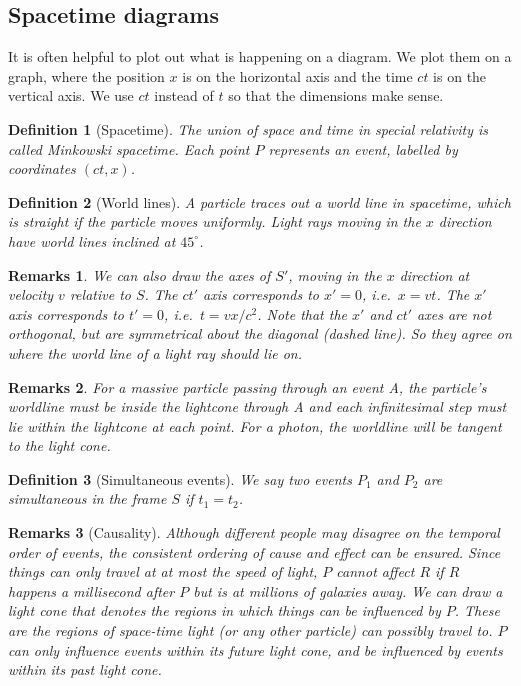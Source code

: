 \documentclass[a4paper]{article}
\newtheorem{remarks}{Remarks}[section]
\theoremstyle{new}
\newtheorem{defi}{Definition}[section]
\begin{document}
\subsection{Spacetime diagrams}
It is often helpful to plot out what is happening on a diagram. We plot them on a graph, where the position $x$ is on the horizontal axis and the time $ct$ is on the vertical axis. We use $ct$ instead of $t$ so that the dimensions make sense.
\begin{defi}[Spacetime]
  The union of space and time in special relativity is called Minkowski spacetime. Each point $P$ represents an event, labelled by coordinates $(ct, x)$. 
\end{defi}
\begin{defi}[World lines]
  A particle traces out a world line in spacetime, which is straight if the particle moves uniformly. Light rays moving in the $x$ direction have world lines inclined at $45^\circ$.
\end{defi}
\begin{remarks}
We can also draw the axes of $S'$, moving in the $x$ direction at velocity $v$ relative to $S$. The $ct'$ axis corresponds to $x' = 0$, i.e.\ $x = vt$. The $x'$ axis corresponds to $t' = 0$, i.e.\ $t = vx/c^2$. Note that the $x'$ and $ct'$ axes are not orthogonal, but are symmetrical about the diagonal (dashed line). So they agree on where the world line of a light ray should lie on.
\end{remarks}
\begin{remarks}
For a massive particle passing through an event A, the particle's worldline must be inside the lightcone through A and each infinitesimal step must lie within the lightcone at each point. For a photon, the worldline will be tangent to the light cone.
\end{remarks}
\begin{defi}[Simultaneous events]
  We say two events $P_1$ and $P_2$ are simultaneous in the frame $S$ if $t_1 = t_2$.
\end{defi}
\begin{remarks}[Causality]
Although different people may disagree on the temporal order of events, the consistent ordering of cause and effect can be ensured. Since things can only travel at at most the speed of light, $P$ cannot affect $R$ if $R$ happens a millisecond after $P$ but is at millions of galaxies away. We can draw a light cone that denotes the regions in which things can be influenced by $P$. These are the regions of space-time light (or any other particle) can possibly travel to. $P$ can only influence events within its future light cone, and be influenced by events within its past light cone.
\end{remarks}
\end{document}
